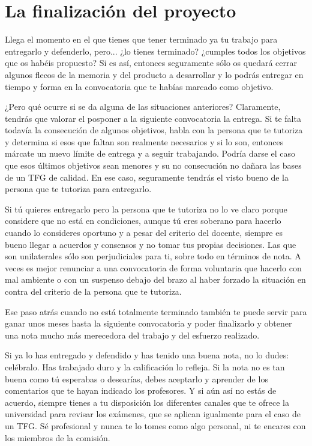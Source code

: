 {%
\section{La finalización del proyecto}

Llega el momento en el que tienes que tener terminado ya tu trabajo para entregarlo y defenderlo, pero... ¿lo tienes terminado? ¿cumples todos los objetivos que os habéis propuesto? Si es así, entonces seguramente sólo os quedará cerrar algunos flecos de la memoria y del producto a desarrollar y lo podrás entregar en tiempo y forma en la convocatoria que te habías marcado como objetivo.

¿Pero qué ocurre si se da alguna de las situaciones anteriores? Claramente, tendrás que valorar el posponer a la siguiente convocatoria la entrega. Si te falta todavía la consecución de algunos objetivos, habla con la persona que te tutoriza y determina si esos que faltan son realmente necesarios y si lo son, entonces márcate un nuevo límite de entrega y a seguir trabajando. Podría darse el caso que esos últimos objetivos sean menores y su no consecución no dañara las bases de un TFG de calidad. En ese caso, seguramente tendrás el visto bueno de la persona que te tutoriza para entregarlo. 

Si tú quieres entregarlo pero la persona que te tutoriza no lo ve claro porque considere que no está en condiciones, aunque tú eres soberano para hacerlo cuando lo consideres oportuno y a pesar del criterio del docente, siempre es bueno llegar a acuerdos y consensos y no tomar tus propias decisiones. Las que son unilaterales sólo son perjudiciales para ti, sobre todo en términos de nota. A veces es mejor renunciar a una convocatoria de forma voluntaria que hacerlo con mal ambiente o con un suspenso debajo del brazo al haber forzado la situación en contra del criterio de la persona que te tutoriza. 

Ese paso atrás cuando no está totalmente terminado también te puede servir para ganar unos meses hasta la siguiente convocatoria y poder finalizarlo y obtener una nota mucho más merecedora del trabajo y del esfuerzo realizado. 

Si ya lo has entregado y defendido y has tenido una buena nota, no lo dudes: celébralo. Has trabajado duro y la calificación lo refleja. Si la nota no es tan buena como tú esperabas o desearías, debes aceptarlo y aprender de los comentarios que te hayan indicado los profesores.  Y si aún así no estás de acuerdo, siempre tienes a tu disposición los diferentes canales que  te ofrece la universidad para revisar los exámenes, que se aplican igualmente para el caso de un TFG. Sé profesional y nunca te lo tomes como algo personal, ni te encares con los miembros de la comisión. 

}
